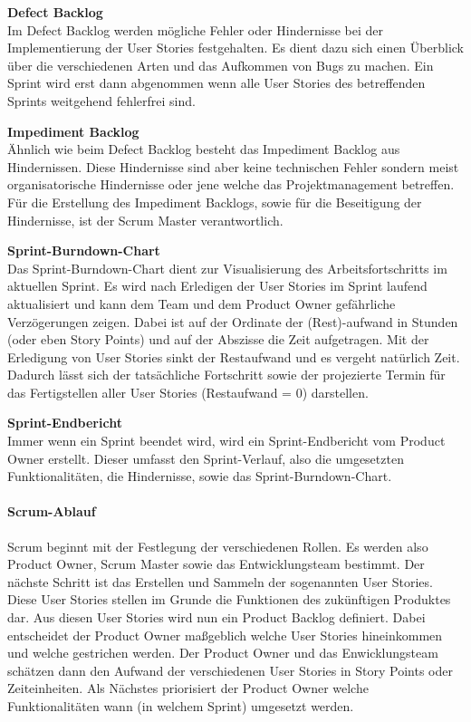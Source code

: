 \textbf{Defect Backlog}\\
Im Defect Backlog werden mögliche Fehler oder Hindernisse bei der Implementierung der User Stories festgehalten. Es dient dazu sich einen Überblick über die verschiedenen Arten und das Aufkommen von Bugs zu machen. Ein Sprint wird erst dann abgenommen wenn alle User Stories des betreffenden Sprints weitgehend fehlerfrei sind.

\textbf{Impediment Backlog}\\
Ähnlich wie beim Defect Backlog besteht das Impediment Backlog aus Hindernissen. Diese Hindernisse sind aber keine technischen Fehler sondern meist organisatorische Hindernisse oder jene welche das Projektmanagement betreffen. Für die Erstellung des Impediment Backlogs, sowie für die Beseitigung der Hindernisse, ist der Scrum Master verantwortlich.

\textbf{Sprint-Burndown-Chart}\\
Das Sprint-Burndown-Chart dient zur Visualisierung des Arbeitsfortschritts im aktuellen Sprint. Es wird nach Erledigen der User Stories im Sprint laufend aktualisiert und kann dem Team und dem Product Owner gefährliche Verzögerungen zeigen. Dabei ist auf der Ordinate der (Rest)-aufwand in Stunden (oder eben Story Points) und auf der Abszisse die Zeit aufgetragen. Mit der Erledigung von User Stories sinkt der Restaufwand und es vergeht natürlich Zeit. Dadurch lässt sich der tatsächliche Fortschritt sowie der projezierte Termin für das Fertigstellen aller User Stories (Restaufwand = 0) darstellen.


\textbf{Sprint-Endbericht}\\
Immer wenn ein Sprint beendet wird, wird ein Sprint-Endbericht vom Product Owner erstellt. Dieser umfasst den Sprint-Verlauf, also die umgesetzten Funktionalitäten, die Hindernisse, sowie das Sprint-Burndown-Chart.

\paragraph{Scrum-Ablauf}
Scrum beginnt mit der Festlegung der verschiedenen Rollen. Es werden also Product Owner, Scrum Master sowie das Entwicklungsteam bestimmt. Der nächste Schritt ist das Erstellen und Sammeln der sogenannten User Stories. Diese User Stories stellen im Grunde die Funktionen des zukünftigen Produktes dar. Aus diesen User Stories wird nun ein Product Backlog definiert. Dabei entscheidet der Product Owner maßgeblich welche User Stories hineinkommen und welche gestrichen werden. Der Product Owner und das Enwicklungsteam schätzen dann den Aufwand der verschiedenen User Stories in Story Points oder Zeiteinheiten. Als Nächstes priorisiert der Product Owner welche Funktionalitäten wann (in welchem Sprint) umgesetzt werden.

